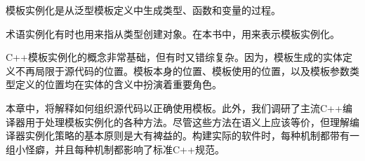 模板实例化是从泛型模板定义中生成类型、函数和变量的过程。

\begin{notice}术语实例化有时也用来指从类型创建对象。在本书中，用来表示模板实例化。
\end{notice}

C++模板实例化的概念非常基础，但有时又错综复杂。因为，模板生成的实体定义不再局限于源代码的位置。模板本身的位置、模板使用的位置，以及模板参数类型定义的位置均在实体的含义中扮演着重要角色。

本章中，将解释如何组织源代码以正确使用模板。此外，我们调研了主流C++编译器用于处理模板实例化的各种方法。尽管这些方法在语义上应该等价，但理解编译器实例化策略的基本原则是大有裨益的。构建实际的软件时，每种机制都带有一组小怪癖，并且每种机制都影响了标准C++规范。